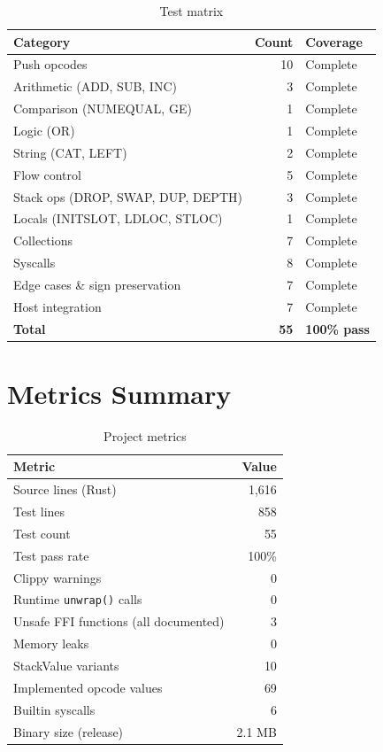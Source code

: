 \documentclass[11pt,a4paper]{article}
\begin{document}
\begin{table}[h]
\centering
\begin{tabular}{@{}lrl@{}}
\toprule
\textbf{Category} & \textbf{Count} & \textbf{Coverage} \\
\midrule
Push opcodes & 10 & Complete \\
Arithmetic (ADD, SUB, INC) & 3 & Complete \\
Comparison (NUMEQUAL, GE) & 1 & Complete \\
Logic (OR) & 1 & Complete \\
String (CAT, LEFT) & 2 & Complete \\
Flow control & 5 & Complete \\
Stack ops (DROP, SWAP, DUP, DEPTH) & 3 & Complete \\
Locals (INITSLOT, LDLOC, STLOC) & 1 & Complete \\
Collections & 7 & Complete \\
Syscalls & 8 & Complete \\
Edge cases \& sign preservation & 7 & Complete \\
Host integration & 7 & Complete \\
\midrule
\textbf{Total} & \textbf{55} & \textbf{100\% pass} \\
\bottomrule
\end{tabular}
\caption{Test matrix}
\label{tab:tests}
\end{table}

\section{Metrics Summary}

\begin{table}[h]
\centering
\begin{tabular}{@{}lr@{}}
\toprule
\textbf{Metric} & \textbf{Value} \\
\midrule
Source lines (Rust) & 1,616 \\
Test lines & 858 \\
Test count & 55 \\
Test pass rate & 100\% \\
Clippy warnings & 0 \\
Runtime \texttt{unwrap()} calls & 0 \\
Unsafe FFI functions (all documented) & 3 \\
Memory leaks & 0 \\
StackValue variants & 10 \\
Implemented opcode values & 69 \\
Builtin syscalls & 6 \\
Binary size (release) & 2.1 MB \\
\bottomrule
\end{tabular}
\caption{Project metrics}
\label{tab:metrics}
\end{table}
\end{document}
